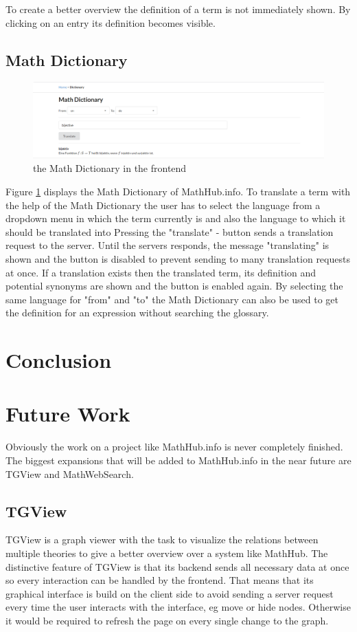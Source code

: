 \documentclass[11pt,a4paper]{article}
\begin{document}
To create a better overview the definition of a term is not immediately shown.
By clicking on an entry its definition becomes visible.

\subsection{Math Dictionary}
\begin{figure}[H]
\includegraphics[width=1\textwidth]{dictionary.png}
\caption{the Math Dictionary in the frontend}
\label{fig:dict}
\end{figure}
Figure \ref{fig:dict} displays the Math Dictionary of MathHub.info.
To translate a term with the help of the Math Dictionary the user has to select the language from a dropdown menu in which the term currently is and also the language to which it should be translated into
Pressing the "translate" - button sends a translation request to the server.
Until the servers responds, the message "translating" is shown and the button is disabled to prevent sending to many translation requests at once.
If a translation exists then the translated term, its definition and potential synonyms are shown and the button is enabled again.
By selecting the same language for "from" and "to" the Math Dictionary can also be used to get the definition for an expression without searching the glossary.

\section{Conclusion} \label{conclusion}
\section{Future Work} \label{future}
Obviously the work on a project like MathHub.info is never completely finished.
The biggest expansions that will be added to MathHub.info in the near future are TGView and MathWebSearch.

\subsection{TGView} 
TGView is a graph viewer with the task to visualize the relations between multiple theories to give a better overview over a system like MathHub.
The distinctive feature of TGView is that its backend sends all necessary data at once so every interaction can be handled by the frontend.
That means that its graphical interface is build on the client side to avoid sending a server request every time the user interacts with the interface, eg move or hide nodes.
Otherwise it would be required to refresh the page on every single change to the graph\cite{tgview}.
 
\end{document}
